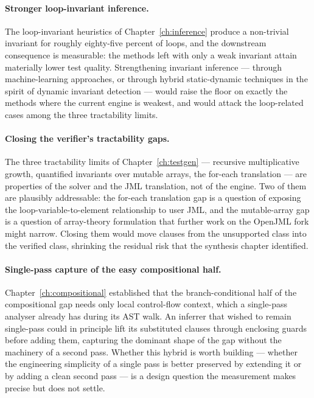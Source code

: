 \paragraph{Stronger loop-invariant inference.} The loop-invariant heuristics of
Chapter~\ref{ch:inference} produce a non-trivial invariant for roughly
eighty-five percent of loops, and the downstream consequence is measurable: the
methods left with only a weak invariant attain materially lower test quality.
Strengthening invariant inference --- through machine-learning approaches, or
through hybrid static-dynamic techniques in the spirit of dynamic invariant
detection --- would raise the floor on exactly the methods where the current
engine is weakest, and would attack the loop-related cases among the three
tractability limits.

\paragraph{Closing the verifier's tractability gaps.} The three tractability
limits of Chapter~\ref{ch:testgen} --- recursive multiplicative growth,
quantified invariants over mutable arrays, the for-each translation --- are
properties of the solver and the JML translation, not of the engine. Two of them
are plausibly addressable: the for-each translation gap is a question of exposing
the loop-variable-to-element relationship to user JML, and the mutable-array gap
is a question of array-theory formulation that further work on the OpenJML fork
might narrow. Closing them would move clauses from the unsupported class into the
verified class, shrinking the residual risk that the synthesis chapter
identified.

\paragraph{Single-pass capture of the easy compositional half.}
Chapter~\ref{ch:compositional} established that the branch-conditional half of
the compositional gap needs only local control-flow context, which a single-pass
analyser already has during its AST walk. An inferrer that wished to remain
single-pass could in principle lift its substituted clauses through enclosing
guards before adding them, capturing the dominant shape of the gap without the
machinery of a second pass. Whether this hybrid is worth building --- whether the
engineering simplicity of a single pass is better preserved by extending it or by
adding a clean second pass --- is a design question the measurement makes precise
but does not settle.

